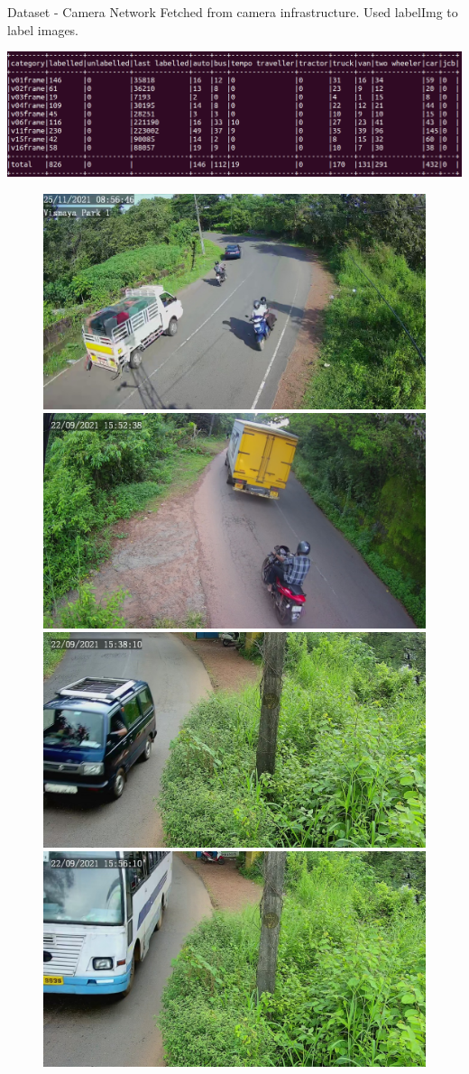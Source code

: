 \documentclass{beamer}
\begin{document}
	
	\begin{frame}[allowframebreaks]{Dataset - Camera Network}
		Fetched from camera infrastructure. Used labelImg to label images.
		\begin{center}
			\includegraphics[width=\linewidth]{res/data_set2/custom_label_stat}
		\end{center}
		
		\newpage
		\begin{figure}
			\includegraphics[width=0.48\linewidth]{"res/data_set2/image1"} \hfill
			\includegraphics[width=0.48\linewidth]{"res/data_set2/image2"}
			\\[\smallskipamount]
			\includegraphics[width=0.48\linewidth]{"res/data_set2/image3"} \hfill
			\includegraphics[width=0.48\linewidth]{"res/data_set2/image4"}
		\end{figure}
	\end{frame}
\end{document}
